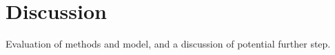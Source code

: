 \chapter{\label{chap:discussion}Discussion}
Evaluation of methods and model, and a discussion of potential further step.